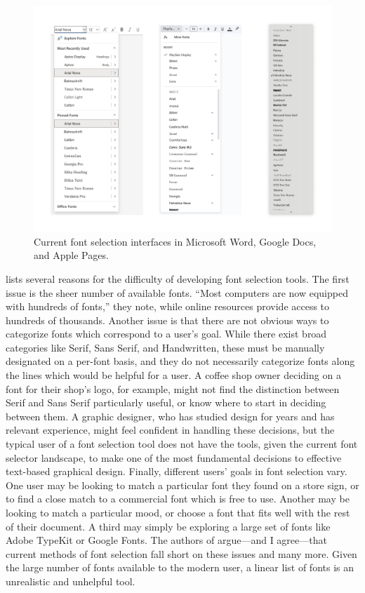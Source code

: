 \begin{figure}[htbp]
    \centering
    \includegraphics[width=1\textwidth]{images/font-selectors.png}
    \caption{Current font selection interfaces in Microsoft Word, Google Docs, and Apple Pages.}
    \label{fig:font-selectors}
\end{figure}

\cite{odonovan2014} lists several reasons for the difficulty of developing font selection tools. The first issue is the sheer number of available fonts. ``Most computers are now equipped with hundreds of fonts,'' they note, while online resources provide access to hundreds of thousands. Another issue is that there are not obvious ways to categorize fonts which correspond to a user's goal. While there exist broad categories like Serif, Sans Serif, and Handwritten, these must be manually designated on a per-font basis, and they do not necessarily categorize fonts along the lines which would be helpful for a user. A coffee shop owner deciding on a font for their shop's logo, for example, might not find the distinction between Serif and Sans Serif particularly useful, or know where to start in deciding between them. A graphic designer, who has studied design for years and has relevant experience, might feel confident in handling these decisions, but the typical user of a font selection tool does not have the tools, given the current font selector landscape, to make one of the most fundamental decisions to effective text-based graphical design. Finally, different users' goals in font selection vary. One user may be looking to match a particular font they found on a store sign, or to find a close match to a commercial font which is free to use. Another may be looking to match a particular mood, or choose a font that fits well with the rest of their document. A third may simply be exploring a large set of fonts like Adobe TypeKit or Google Fonts. The authors of \cite{odonovan2014} argue—and I agree—that current methods of font selection fall short on these issues and many more. Given the large number of fonts available to the modern user, a linear list of fonts is an  unrealistic and unhelpful tool.

